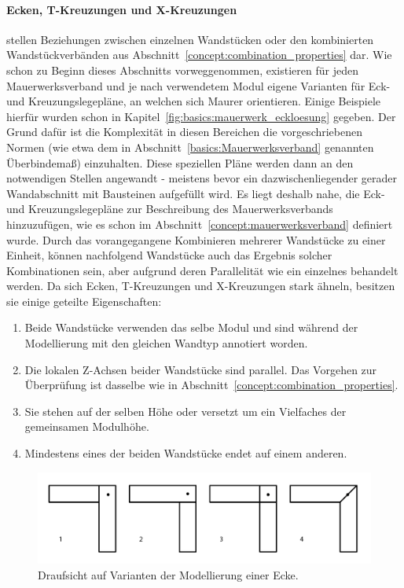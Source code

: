 \paragraph*{Ecken, T-Kreuzungen und X-Kreuzungen}\label{concept:corner_etc_properties} stellen Beziehungen zwischen einzelnen Wandstücken oder den kombinierten Wandstückverbänden aus Abschnitt~\ref{concept:combination_properties} dar.
Wie schon zu Beginn dieses Abschnitts vorweggenommen, existieren für jeden Mauerwerksverband und je nach verwendetem Modul eigene Varianten für Eck- und Kreuzungslegepläne, an welchen sich Maurer orientieren.
Einige Beispiele hierfür wurden schon in Kapitel~\ref{fig:basics:mauerwerk_eckloesung} gegeben.
Der Grund dafür ist die Komplexität in diesen Bereichen die vorgeschriebenen Normen (wie etwa dem in Abschnitt~\ref{basics:Mauerwerksverband} genannten Überbindemaß) einzuhalten.
Diese speziellen Pläne werden dann an den notwendigen Stellen angewandt - meistens bevor ein dazwischenliegender gerader Wandabschnitt mit Bausteinen aufgefüllt wird.
Es liegt deshalb nahe, die Eck- und Kreuzungslegepläne zur Beschreibung des Mauerwerksverbands hinzuzufügen, wie es schon im Abschnitt~\ref{concept:mauerwerksverband} definiert wurde.
Durch das vorangegangene Kombinieren mehrerer Wandstücke zu einer Einheit, können nachfolgend Wandstücke auch das Ergebnis solcher Kombinationen sein, aber aufgrund deren Parallelität wie ein einzelnes behandelt werden.
Da sich Ecken, T-Kreuzungen und X-Kreuzungen stark ähneln, besitzen sie einige geteilte Eigenschaften:
\begin{enumerate}
    \item\label{concept:tmp1} Beide Wandstücke verwenden das selbe Modul und sind während der Modellierung mit den gleichen Wandtyp annotiert worden.
    \item Die lokalen Z-Achsen beider Wandstücke sind parallel. Das Vorgehen zur Überprüfung ist dasselbe wie in Abschnitt~\ref{concept:combination_properties}.
    \item Sie stehen auf der selben Höhe oder versetzt um ein Vielfaches der gemeinsamen Modulhöhe.
    \item\label{concept:tmp4} Mindestens eines der beiden Wandstücke endet auf einem anderen.
\end{enumerate}

\begin{figure}[ht]
    \centering
    \includegraphics[width=0.8\columnwidth]{fig/ecken_variationen.png}
    \caption{Draufsicht auf Varianten der Modellierung einer Ecke.}\label{fig:concept:ecken_variationen}
\end{figure}

